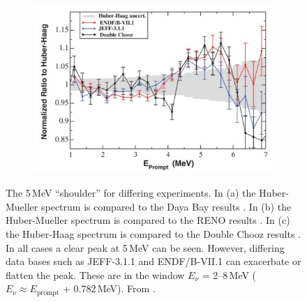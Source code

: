 \begin{figure}[!h]
\begin{subfigure}{.48\textwidth}
\includegraphics[width=\linewidth]{Chapter2/Figs/Raster/huberHaag_DoubleChooz_Rmills2015.png}
  \captionsetup{width=.9\linewidth}
  \caption{}
  \label{subFig:DoubleChooz5MevBump}
\end{subfigure}
\caption{The 5\,MeV ``shoulder'' for differing experiments. In (a) the Huber-Mueller spectrum is compared to the Daya Bay results \cite{dayaBay2016_anFlux}. In (b) the Huber-Mueller spectrum is compared to the RENO results \cite{reno_recentResults_2014}. In (c) the Huber-Haag spectrum is compared to the Double Chooz results \cite{abe2014improved}. In all cases a clear peak at 5\,MeV can be seen. However, differing data bases such as JEFF-3.1.1 and ENDF/B-VII.1 can exacerbate or flatten the peak. These are in the window $E_\nu$ = 2--8\,MeV ($E_\nu \approx E_{\textrm{prompt}}$ + 0.782\,MeV). From  \cite{Hayes_implicationsShoulder_2015}.}
\label{fig:5MevBumps_DB_R_DC}
\end{figure} 
